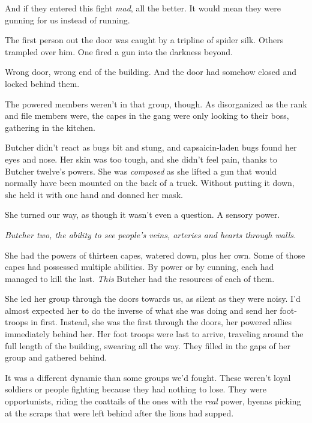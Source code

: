 And if they entered this fight \emph{mad}, all the better.  It would mean they were gunning for us instead of running.



The first person out the door was caught by a tripline of spider silk.  Others trampled over him.  One fired a gun into the darkness beyond.



Wrong door, wrong end of the building.  And the door had somehow closed and locked behind them.



The powered members weren't in that group, though.  As disorganized as the rank and file members were, the capes in the gang were only looking to their boss, gathering in the kitchen.



Butcher didn't react as bugs bit and stung, and capsaicin-laden bugs found her eyes and nose.  Her skin was too tough, and she didn't feel pain, thanks to Butcher twelve's powers.  She was \emph{composed} as she lifted a gun that would normally have been mounted on the back of a truck.  Without putting it down, she held it with one hand and donned her mask.



She turned our way, as though it wasn't even a question.  A sensory power.



\emph{Butcher two, the ability to see people's veins, arteries and hearts through walls.}



She had the powers of thirteen capes, watered down, plus her own.  Some of those capes had possessed multiple abilities.  By power or by cunning, each had managed to kill the last.  \emph{This} Butcher had the resources of each of them.



She led her group through the doors towards us, as silent as they were noisy.  I'd almost expected her to do the inverse of what she was doing and send her foot-troops in first.  Instead, she was the first through the doors, her powered allies immediately behind her.  Her foot troops were last to arrive, traveling around the full length of the building, swearing all the way.  They filled in the gaps of her group and gathered behind.



It was a different dynamic than some groups we'd fought.  These weren't loyal soldiers or people fighting because they had nothing to lose.  They were opportunists, riding the coattails of the ones with the \emph{real} power, hyenas picking at the scraps that were left behind after the lions had supped.



